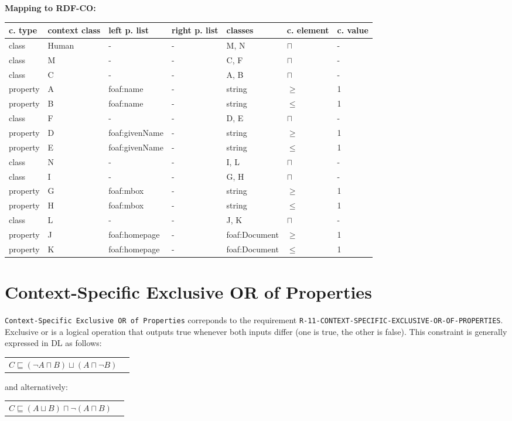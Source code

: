 \documentclass{llncs}
\newcommand{\ms}[1]{\texttt{#1}}
\newenvironment{gcotable}{
  \scriptsize
  \sffamily
  \vspace{0cm}
	\begin{center}
	\textbf{\vspace{0.4cm}Mapping to RDF-CO:} \\
  \begin{tabular}{l|l|l|l|l|l|l}
	\hline
  \textbf{c. type} & \textbf{context class} & \textbf{left p. list} & \textbf{right p. list} & \textbf{classes} & \textbf{c. element} & \textbf{c. value} \\
  \hline

}{
  \hline
  \end{tabular}
	\end{center}
}
\newenvironment{DL}{
  \vspace{0cm}
	\begin{center}
  \begin{tabular}{r l}

}{
  \end{tabular}
	\end{center}
}
\begin{document}
\begin{gcotable}
class & Human & - & - & M, N & $\sqcap$ & - \\
\hline
class & M & - & - & C, F & $\sqcap$ & - \\
class & C & - & - & A, B & $\sqcap$ & - \\
property & A & foaf:name & - & string & $\geq$ & 1 \\
property & B & foaf:name & - & string & $\leq$ & 1 \\
class & F & - & - & D, E & $\sqcap$ & - \\
property & D & foaf:givenName & - & string & $\geq$ & 1 \\
property & E & foaf:givenName & - & string & $\leq$ & 1 \\
\hline
class & N & - & - & I, L & $\sqcap$ & - \\
class & I & - & - & G, H & $\sqcap$ & - \\
property & G & foaf:mbox & - & string & $\geq$ & 1 \\
property & H & foaf:mbox & - & string & $\leq$ & 1 \\
class & L & - & - & J, K & $\sqcap$ & - \\
property & J & foaf:homepage & - & foaf:Document & $\geq$ & 1 \\
property & K & foaf:homepage & - & foaf:Document & $\leq$ & 1 \\
\end{gcotable}

\section{Context-Specific Exclusive OR of Properties}

\ms{Context-Specific Exclusive OR of Properties} correponds to the requirement
\ms{R-11-CONTEXT-SPECIFIC-EXCLUSIVE-OR-OF-PROPERTIES}.
Exclusive or is a logical operation that outputs true whenever both inputs differ (one is true, the other is false).
This constraint is generally expressed in DL as follows:

\begin{DL}
$C \sqsubseteq (\neg A \sqcap B) \sqcup (A \sqcap \neg B)$ \\
\end{DL}

and alternatively:

\begin{DL}
$C \sqsubseteq (A \sqcup B) \sqcap \neg(A \sqcap B)$ \\
\end{DL}
\end{document}

